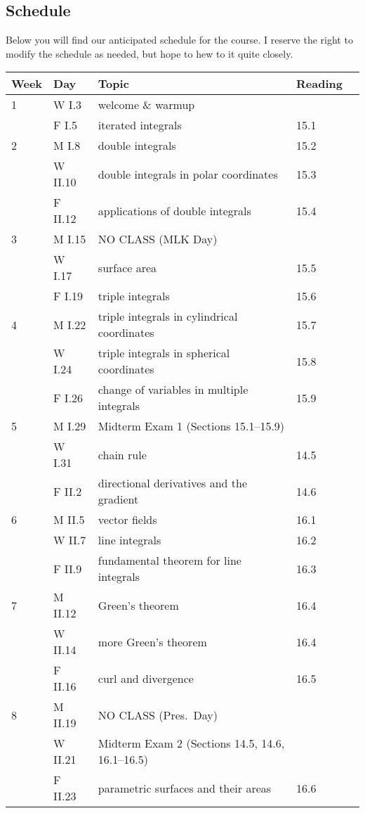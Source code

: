 \documentclass[11pt,twoside]{amsart}
\begin{document}
\newpage

\subsection*{Schedule}
Below you will find our anticipated schedule for the course. I reserve the right to modify the schedule as needed, but hope to hew to it quite closely.

\begin{center}
\begin{longtable}{lllll} \toprule
Week &Day &Topic &Reading\\ \midrule
1 &W I.3 &welcome \& warmup \\
&F I.5 &iterated integrals &15.1\\ \midrule
2 &M I.8 &double integrals &15.2\\
&W II.10 &double integrals in polar coordinates &15.3\\
&F II.12 &applications of double integrals &15.4\\ \midrule
3 &M I.15 &NO CLASS (MLK Day) &\\
&W I.17 &surface area &15.5\\
&F I.19 &triple integrals &15.6\\ \midrule
4 &M I.22 &triple integrals in cylindrical coordinates &15.7\\
&W I.24 &triple integrals in spherical coordinates &15.8\\
&F I.26 &change of variables in multiple integrals &15.9\\ \midrule
5 &M I.29 &Midterm Exam 1 (Sections 15.1--15.9) &\\
&W I.31 &chain rule &14.5\\
&F II.2 &directional derivatives and the gradient &14.6\\ \midrule
6 &M II.5 &vector fields &16.1\\
&W II.7 &line integrals &16.2\\
&F II.9 &fundamental theorem for line integrals &16.3\\ \midrule
7 &M II.12 &Green's theorem &16.4\\
&W II.14 &more Green's theorem &16.4\\
&F II.16 &curl and divergence &16.5\\ \midrule
8 &M II.19 &NO CLASS (Pres.~Day) &\\
&W II.21 &Midterm Exam 2 (Sections 14.5, 14.6, 16.1--16.5) &\\
&F II.23 &parametric surfaces and their areas &16.6\\ \midrule

\end{longtable}
\end{center}
\end{document}
